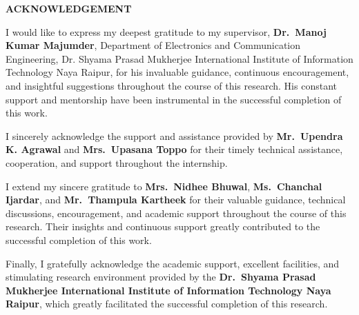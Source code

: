 \thispagestyle{empty}
\vspace*{1.5cm}

\begin{center}
    {\Huge \textbf{ACKNOWLEDGEMENT}}
\end{center}

\vspace{1cm}

I would like to express my deepest gratitude to my supervisor, \textbf{Dr.~Manoj Kumar Majumder}, Department of Electronics and Communication Engineering, Dr. Shyama Prasad Mukherjee International Institute of Information Technology Naya Raipur, for his invaluable guidance, continuous encouragement, and insightful suggestions throughout the course of this research. His constant support and mentorship have been instrumental in the successful completion of this work.

\vspace{0.6cm}

I sincerely acknowledge the support and assistance provided by \textbf{Mr.~Upendra K. Agrawal} and \textbf{Mrs.~Upasana Toppo} for their timely technical assistance, cooperation, and support throughout the internship.

\vspace{0.6cm}

I extend my sincere gratitude to \textbf{Mrs.~Nidhee Bhuwal}, \textbf{Ms.~Chanchal Ijardar}, and \textbf{Mr.~Thampula Kartheek} for their valuable guidance, technical discussions, encouragement, and academic support throughout the course of this research. Their insights and continuous support greatly contributed to the successful completion of this work.

\vspace{0.6cm}

Finally, I gratefully acknowledge the academic support, excellent facilities, and stimulating research environment provided by the \textbf{Dr.~Shyama Prasad Mukherjee International Institute of Information Technology Naya Raipur}, which greatly facilitated the successful completion of this research.
